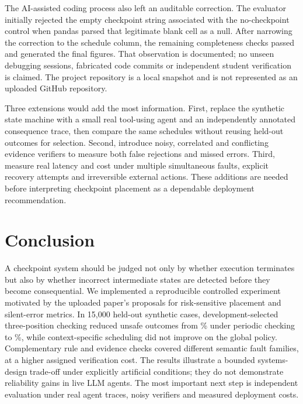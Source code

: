 \documentclass[conference]{IEEEtran}
\begin{document}
The AI-assisted coding process also left an auditable correction. The evaluator initially rejected the empty checkpoint string associated with the no-checkpoint control when pandas parsed that legitimate blank cell as a null. After narrowing the correction to the schedule column, the remaining completeness checks passed and generated the final figures. That observation is documented; no unseen debugging sessions, fabricated code commits or independent student verification is claimed. The project repository is a local snapshot and is not represented as an uploaded GitHub repository.

Three extensions would add the most information. First, replace the synthetic state machine with a small real tool-using agent and an independently annotated consequence trace, then compare the same schedules without reusing held-out outcomes for selection. Second, introduce noisy, correlated and conflicting evidence verifiers to measure both false rejections and missed errors. Third, measure real latency and cost under multiple simultaneous faults, explicit recovery attempts and irreversible external actions. These additions are needed before interpreting checkpoint placement as a dependable deployment recommendation.

\section{Conclusion}
A checkpoint system should be judged not only by whether execution terminates but also by whether incorrect intermediate states are detected before they become consequential. We implemented a reproducible controlled experiment motivated by the uploaded paper's proposals for risk-sensitive placement and silent-error metrics. In 15,000 held-out synthetic cases, development-selected three-position checking reduced unsafe outcomes from \resPeriodicUnsafe\% under periodic checking to \resGlobalRiskUnsafe\%, while context-specific scheduling did not improve on the global policy. Complementary rule and evidence checks covered different semantic fault families, at a higher assigned verification cost. The results illustrate a bounded systems-design trade-off under explicitly artificial conditions; they do not demonstrate reliability gains in live LLM agents. The most important next step is independent evaluation under real agent traces, noisy verifiers and measured deployment costs.
\end{document}
